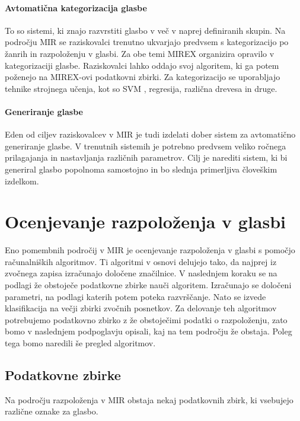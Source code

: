 \documentclass[a4paper, 12pt]{book}
\begin{document}
{\paragraph{Avtomatična kategorizacija glasbe}

To so sistemi, ki znajo razvrstiti glas\-bo v več v naprej definiranih skupin. Na področju MIR se raziskovalci trenutno ukvarjajo predvsem s kategorizacijo po žanrih in razpoloženju v glasbi. Za obe temi MIREX organizira opravilo v kategorizaciji glasbe. Raziskovalci lahko oddajo svoj algoritem, ki ga potem poženejo na MIREX-ovi podatkovni zbirki. Za kategorizacijo se uporabljajo tehnike strojnega učenja, kot so SVM \cite{ben2010user}, regresija, različna drevesa in druge.

\paragraph{Generiranje glasbe}

Eden od ciljev raziskovalcev v MIR je tudi izdelati dober sistem za avtomatično generiranje glasbe. V trenutnih sistemih je potrebno predvsem veliko ročnega prilagajanja in nastavljanja različnih parametrov. Cilj je narediti sistem, ki bi generiral glasbo popolnoma samostojno in bo slednja primerljiva človeškim izdelkom.



\section{Ocenjevanje razpoloženja v glasbi}

Eno pomembnih področij v MIR je ocenjevanje razpoloženja v glasbi s pomočjo računalniških algoritmov. Ti algoritmi v osnovi delujejo tako, da najprej iz zvočnega zapisa izračunajo določene značilnice. V naslednjem koraku se na podlagi že obstoječe podatkovne zbirke nauči algoritem. Izračunajo se določeni parametri, na podlagi katerih potem poteka razvrščanje. Nato se izvede klasifikacija na večji zbirki zvočnih posnetkov. Za delovanje teh algoritmov potrebujemo podatkovno zbirko z že obstoječimi podatki o razpoloženju, zato bomo v naslednjem podpoglavju opisali, kaj na tem področju že obstaja. Poleg tega bomo naredili še pregled algoritmov.

\subsection{Podatkovne zbirke}

Na področju razpoloženja v MIR obstaja nekaj podatkovnih zbirk, ki vsebujejo različne oznake za glasbo. 

}
\end{document}
